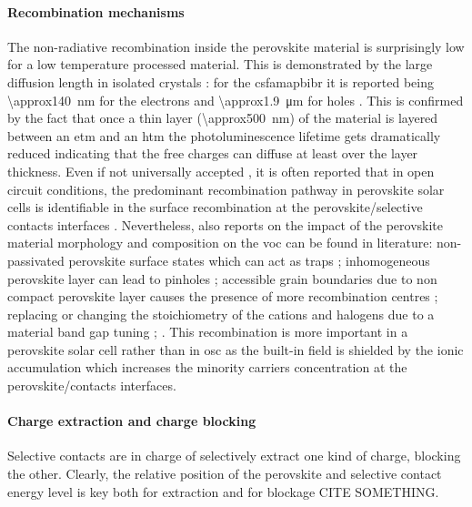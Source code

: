	\paragraph{Recombination mechanisms}
The non-radiative recombination inside the perovskite material is surprisingly low for a low temperature processed material. This is demonstrated by the large diffusion length in isolated crystals \cite{Wehrenfennig2014,Wehrenfennig2014a,Stranks2013,Xing2013,Shi2015a}: for the \gls{csfamapbibr} it is reported being \SI{\approx140}{\nm} for the electrons and \SI{\approx1.9}{\um} for holes \cite{Liu2017}.
This is confirmed by the fact that once a thin layer (\SI{\approx500}{\nm}) of the material is layered between an \gls{etm} and an \gls{htm} the photoluminescence lifetime gets dramatically reduced \cite{Jimenez-Lopez2017} indicating that the free charges can diffuse  at least over the layer thickness.
Even if not universally accepted \cite{Valadez-Villalobos2019}, it is often reported that in open circuit conditions, the predominant recombination pathway in perovskite solar cells is identifiable in the surface recombination at the perovskite/selective contacts interfaces \cite{Calado2018b,Stolterfoht2018a,Stolterfoht2018,Gelmetti2019,Shao2016}.
Nevertheless, also reports on the impact of the perovskite material morphology and composition on the \gls{voc} can be found in literature: non-passivated perovskite surface states which can act as traps \cite{Zheng2017}; inhomogeneous perovskite layer can lead to pinholes \cite{Lee2015,Montcada2017,Qiu2016}; accessible grain boundaries due to non compact perovskite layer causes the presence of more recombination centres \cite{Shao2016a}; replacing or changing the stoichiometry of the cations and halogens due to a material band gap tuning \cite{Eperon2014,Noh2013a}; .
This recombination is more important in a perovskite solar cell rather than in \gls{osc} as the built-in field is shielded by the ionic accumulation which increases the minority carriers concentration at the perovskite/contacts interfaces.

\paragraph{Charge extraction and charge blocking}
Selective contacts are in charge of selectively extract one kind of charge, blocking the other. Clearly, the relative position of the perovskite and selective contact energy level is key both for extraction \cite{CorreaBaena2015} and for blockage CITE SOMETHING.

